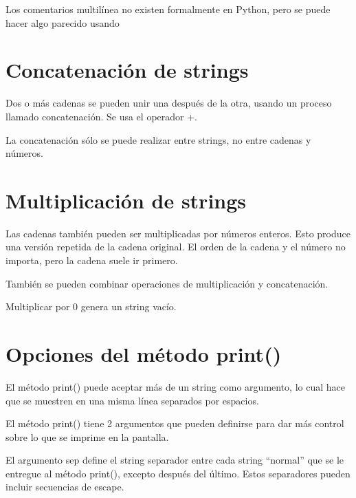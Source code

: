 \documentclass{report}
\newcommand{\doble}[1]{``#1''}
\begin{document}
{Los comentarios multilínea no existen formalmente en Python, pero se puede hacer algo parecido usando


\section{Concatenación de strings}

Dos o más cadenas se pueden unir una después de la otra, usando un proceso llamado concatenación. Se usa el operador +.


La concatenación sólo se puede realizar entre strings, no entre cadenas y números.


\section{Multiplicación de strings}

Las cadenas también pueden ser multiplicadas por números enteros. Esto produce una versión repetida de la cadena original. El orden de la cadena y el número no importa, pero la cadena suele ir primero.


También se pueden combinar operaciones de multiplicación y concatenación.


Multiplicar por 0 genera un string vacío.


\section{Opciones del método print()}

El método print() puede aceptar más de un string como argumento, lo cual hace que se muestren en una misma línea separados por espacios.


El método print() tiene 2 argumentos que pueden definirse para dar más control sobre lo que se imprime en la pantalla.

El argumento sep define el string separador entre cada string \doble{normal} que se le entregue al método print(), excepto después del último. Estos separadores pueden incluir secuencias de escape.

}
\end{document}
